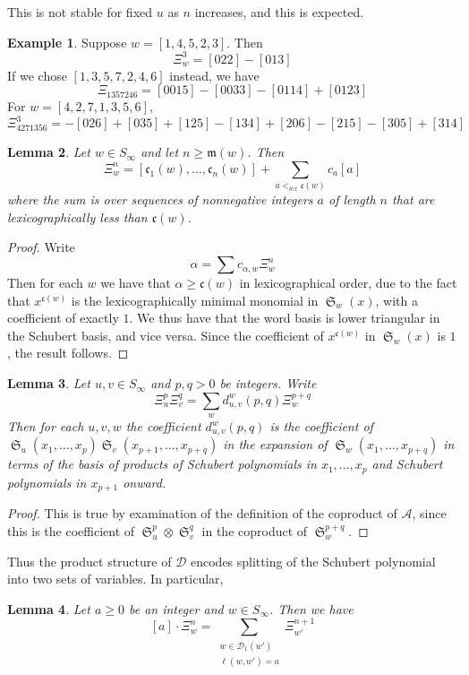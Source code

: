 \documentclass{amsart}
\newtheorem{lemma}{Lemma}[subsection]
\theoremstyle{definition}
\newtheorem{example}[lemma]{Example}
\theoremstyle{remark}
\numberwithin{equation}{subsection}
\DeclareMathOperator{\sch}{\mathfrak{S}}
\newcommand{\dsch}{\ensuremath{\Xi}}
\newcommand{\coma}{\mathcal{A}}
\newcommand{\dcoma}{\mathcal{D}}
\newcommand{\code}{\mathfrak{c}}
\newcommand{\maxd}{\mathfrak{m}}
\begin{document}
This is not stable for fixed $u$ as $n$ increases, and this is expected.


\begin{example}
Suppose $w = [1,4,5,2,3]$. Then
$$\dsch_w^3 = [022] - [013]$$
If we chose $[1,3,5,7,2,4,6]$ instead, we have
$$\dsch_{1357246} = [0015] - [0033] - [0114] + [0123]$$
For $w=[4,2,7,1,3,5,6]$,
$$\dsch_{4271356}^3 = -[026] + [035] + [125] - [134] + [206] - [215] - [305] + [314]$$
\end{example}

\begin{lemma} \label{lemma:lexperm}
Let $w\in S_\infty$ and let $n\geq \maxd(w)$. Then
$$\dsch_w^n = [\code_1(w),\ldots,\code_n(w)] + \sum_{a <_{lex} \code(w)} c_a [a]$$
where the sum is over sequences of nonnegative integers $a$ of length $n$ that are lexicographically less than $\code(w)$.
\end{lemma}
\begin{proof}
Write
$$\alpha = \sum c_{\alpha, w}\dsch_w^n$$
Then for each $w$ we have that $\alpha\geq \code(w)$ in lexicographical order, due to the fact that $x^{\code(w)}$ is the lexicographically minimal monomial in $\sch_w(x)$, with a coefficient of exactly $1$. We thus have that the word basis is lower triangular in the Schubert basis, and vice versa. Since the coefficient of $x^{\code(w)}$ in $\sch_w(x)$ is $1$, the result follows.
\end{proof}

\begin{lemma}
	Let $u,v\in S_\infty$ and $p,q>0$ be integers. Write
	$$\dsch_u^p\dsch_v^q = \sum_w d_{u,v}^w(p,q)\dsch_w^{p+q}$$
	Then for each $u,v,w$ the coefficient $d_{u,v}^w(p,q)$ is the coefficient of $\sch_u(x_1,\ldots,x_p)\sch_v(x_{p+1},\ldots,x_{p+q})$ in the expansion of $\sch_w(x_1,\ldots,x_{p+q})$ in terms of the basis of products of Schubert polynomials in $x_1,\ldots,x_p$ and Schubert polynomials in $x_{p+1}$ onward.
\end{lemma}
\begin{proof}
	This is true by examination of the definition of the coproduct of $\coma$, since this is the coefficient of $\sch_u^p\otimes \sch_v^q$ in the coproduct of $\sch_w^{p+q}$.
\end{proof}

Thus the product structure of $\dcoma$ encodes splitting of the Schubert polynomial into two sets of variables. In particular,
\begin{lemma} \label{lemma:dpieri}
Let $a\geq 0$ be an integer and $w\in S_\infty$. Then we have
$$[a]\cdot \dsch_{w}^{n} = \sum_{\substack{w\in\mathcal{D}_1(w')\\\ell(w,w')=a}} \dsch_{w'}^{n+1}$$
\end{lemma}
\end{document}
